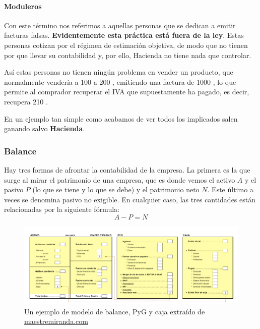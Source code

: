 \documentclass[nochap,palatino,shortheader]{apuntes}
\begin{document}
\paragraph{Moduleros}

Con este término nos referimos a aquellas personas que se dedican a emitir facturas falsas. \textbf{Evidentemente esta práctica está fuera de la ley}. Estas personas cotizan por el régimen de estimación objetiva, de modo que no tienen por que llevar su contabilidad y, por ello, Hacienda no tiene nada que controlar.

Así estas personas no tienen ningún problema en vender un producto, que normalmente vendería a 100  a 200 \texteuro, emitiendo una factura de 1000 \texteuro, lo que permite al comprador recuperar el IVA que supuestamente ha pagado, es decir, recupera 210 \texteuro.

En un ejemplo tan simple como acabamos de ver todos los implicados salen ganando salvo \textbf{Hacienda}.

\subsubsection{Balance}

Hay tres formas de afrontar la contabilidad de la empresa. La primera es la que surge al mirar el patrimonio de una empresa, que es donde vemos el activo $A$ y el pasivo $P$ (lo que se tiene y lo que se debe) y el patrimonio neto $N$. Este último a veces se denomina pasivo no exigible. En cualquier caso, las tres cantidades están relacionadas por la siguiente fórmula:
\[ A - P = N\]

\begin{figure}[hbtp]
\centering
\includegraphics[width=\textwidth]{img/Balance_PyG_Caja.png}
\caption{Un ejemplo de modelo de balance, PyG y caja extraído de \href{http://maestremiranda.com/techdir/wp-content/uploads/2015/10/EF0.-Bal_PYG_Caja.pdf}{maestremiranda.com}}
\label{fig:BalancePyGCaja}
\end{figure}
\end{document}
